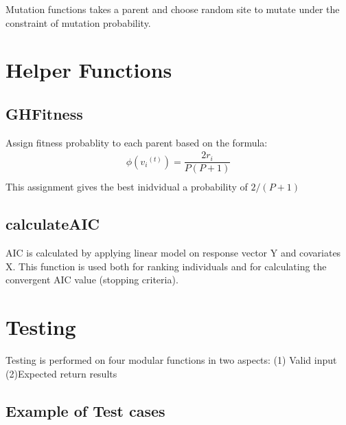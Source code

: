 \documentclass{article}\usepackage[]{graphicx}\usepackage[]{color}
\begin{document}
Mutation functions takes a parent and choose random site to mutate under the constraint of mutation probability.\\
\section{Helper Functions}
\subsection{GHFitness}
Assign fitness probablity to each parent based on the formula:
\begin{gather*}
\phi({v_i}^{(t)}) = \dfrac{2r_i}{P(P+1)}\\
\end{gather*}
This assignment gives the best inidvidual a probability of \(2/(P+1)\)
\subsection{calculateAIC}
AIC is calculated by applying linear model on response vector Y and covariates X. This function is used both for ranking individuals and for calculating the convergent AIC value (stopping criteria).

\section{Testing}
Testing is performed on four modular functions in two aspects: (1) Valid input (2)Expected return results
\subsection{Example of Test cases}
\end{document}

